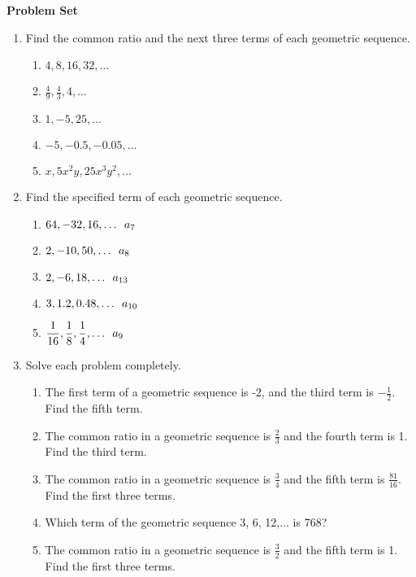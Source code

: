 \textbf{Problem Set}

\vspce

\begin{enumerate}[label = \Alph*. ]
\item \hspce Find the common ratio and the next three terms of each geometric sequence.   
	\begin{enumerate}[label = \arabic*. ]
	
	\item \hspce $4, 8, 16, 32,\ldots$
	\item \hspce $\displaystyle \frac{4}{9}, \frac{4}{3}, 4,\ldots $
	\item \hspce $1, -5, 25,\ldots$
	\item \hspce $-5, -0.5, -0.05,\ldots$
	\item \hspce $x, 5x^{2}y, 25x^{3}y^{2},\ldots $
	 
	\end{enumerate}

\item \hspce Find the specified term of each geometric sequence. 
	\begin{enumerate}[label = \arabic*. ]
	\item \hspce $64, -32, 16,\ldots \hspace{0.5em}  a_{7}$
	\item \hspce $2, -10, 50,\ldots \hspace{0.5em}  a_{8}$
	\item \hspce $2, -6, 18,\ldots \hspace{0.5em}  a_{13}$
	\item \hspce $3, 1.2, 0.48,\ldots \hspace{0.5em}  a_{10}$
	\item \hspce $\displaystyle  \frac{1}{16}, \frac{1}{8}, \frac{1}{4},\ldots \hspace{0.5em}  a_{9}$
	\end{enumerate}


\item \hspce Solve each problem completely. 
	\begin{enumerate}[label = \arabic*. ]
	\item \hspce The first term of a geometric sequence is -2, and the third term is $-\frac{1}{2}$. Find the fifth term. 

	\item \hspce The common ratio in a geometric sequence is $\frac{2}{3}$ and the fourth term is 1. Find the third term. 

	\item \hspce The common ratio in a geometric sequence is $\frac{3}{4}$ and the fifth term is $\frac{81}{16}$. Find the first three terms.

	\item \hspce Which term of the geometric sequence 3, 6, 12,... is 768?
	\item \hspce The common ratio in a geometric sequence is $\frac{3}{2}$ and the fifth term is 1. Find the first three terms.

	\end{enumerate}
\end{enumerate}